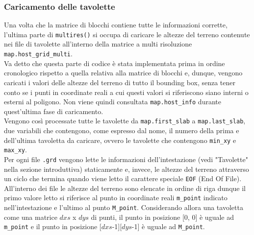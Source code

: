 			\subsubsection{Caricamento delle tavolette}
				Una volta che la matrice di blocchi contiene tutte le informazioni corrette, l'ultima parte di \texttt{multires()} si occupa di caricare le altezze del terreno contenute nei file di tavolette all'interno della matrice a multi risoluzione \texttt{map.host\_grid\_multi}.\\
				Va detto che questa parte di codice \`{e} stata implementata prima in ordine cronologico rispetto a quella relativa alla matrice di blocchi e, dunque, vengono caricati i valori delle altezze del terreno di tutto il bounding box, senza tener conto se i punti in coordinate reali a cui questi valori si riferiscono siano interni o esterni al poligono. Non viene quindi consultata \texttt{map.host\_info} durante quest'ultima fase di caricamento.\\
				Vengono cos\`{i} processate tutte le tavolette da \texttt{map.first\_slab} a \texttt{map.last\_slab}, due variabili che contengono, come espresso dal nome, il numero della prima e dell'ultima tavoletta da caricare, ovvero le tavolette che contengono \texttt{min\_xy} e \texttt{max\_xy}.\\
				Per ogni file \texttt{.grd} vengono lette le informazioni dell'intestazione (vedi "Tavolette" nella sezione introduttiva) staticamente e, invece, le altezze del terreno attraverso un ciclo che termina quando viene letto il carattere speciale \texttt{EOF} (End Of File). \\
				All'interno dei file le altezze del terreno sono elencate in ordine di riga dunque il primo valore letto si riferisce al punto in coordinate reali \texttt{m\_point} indicato nell'intestazione e l'ultimo al punto \texttt{M\_point}. Considerando allora una tavoletta come una matrice $dxs$ x $dys$ di punti, il punto in posizione [0, 0] \`{e} uguale ad \texttt{m\_point} e il punto in posizione [$dxs$-1][$dys$-1] \`{e} uguale ad \texttt{M\_point}. \\

